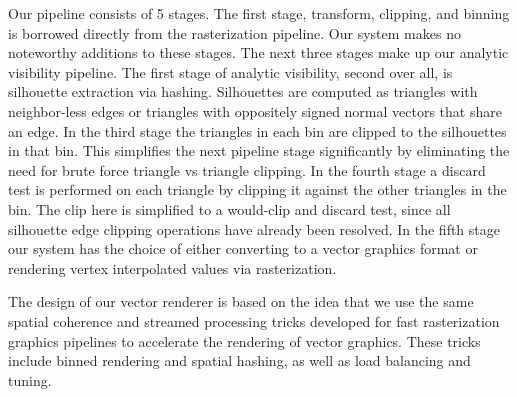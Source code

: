 \documentclass[review]{acmsiggraph}
\begin{document}
Our pipeline consists of 5 stages. The first stage, transform, clipping, and
binning is borrowed directly from the rasterization pipeline. Our system makes
no noteworthy additions to these stages. The next three stages make up our
analytic visibility pipeline. The first stage of analytic visibility, second
over all, is silhouette extraction via hashing. Silhouettes are computed as
triangles with neighbor-less edges or triangles with oppositely signed normal
vectors that share an edge. In the third stage the triangles in each bin are
clipped to the silhouettes in that bin.  This simplifies the next pipeline
stage significantly by eliminating the need for brute force triangle vs
triangle clipping. In the fourth stage a discard test is performed on each
triangle by clipping it against the other triangles in the bin. The clip here
is simplified to a would-clip and discard test, since all silhouette edge
clipping operations have already been resolved. In the fifth stage our system
has the choice of either converting to a vector graphics format or rendering
vertex interpolated values via rasterization.

The design of our vector renderer is based on the idea that we use the same
spatial coherence and streamed processing tricks developed for fast
rasterization graphics pipelines to accelerate the rendering of vector
graphics. These tricks include binned rendering and spatial hashing, as well
as load balancing and tuning.

\end{document}
